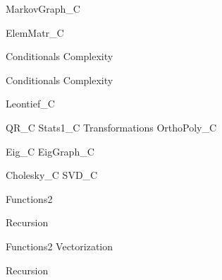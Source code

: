 \documentclass{newsiambook}
\begin{document}
{MarkovGraph_C}





{ElemMatr_C}

\begin{python}
{Conditionals}
{Complexity}
\end{python}

\begin{matlab}
{Conditionals}
{Complexity}
\end{matlab}

{Leontief_C}


{QR_C}
{Stats1_C}
{Transformations}
{OrthoPoly_C}

{Eig_C}
{EigGraph_C}

{Cholesky_C}
{SVD_C}


\begin{python}
{Functions2}

{Recursion}

\end{python}

\begin{matlab}
{Functions2}
{Vectorization}

{Recursion}
\end{matlab}
\end{document}
